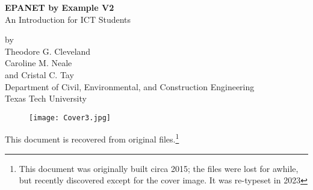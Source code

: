 \documentclass[12pt]{article}
\begin{document}
\begingroup
\begin{center}
{\textbf{{EPANET by Example V2}}
{ \\ An Introduction for ICT Students  }}
\end{center}

\begin{center}
by \\
Theodore G. Cleveland \\ Caroline M. Neale\\ and Cristal C. Tay\\
Department of Civil, Environmental, and Construction Engineering\\
Texas Tech University\\
\end{center}

\begin{figure}[h!] %
   \centering
   \texttt{[image: Cover3.jpg]} 
\end{figure}
\begin{figure}[h!] %
   \centering
\end{figure}

\endgroup

This document is recovered from original files.\footnote{This document was originally built circa 2015; the files were lost for awhile, but recently discovered except for the cover image.  It was re-typeset in 2023}
~\newpage



\tableofcontents



\end{document}
